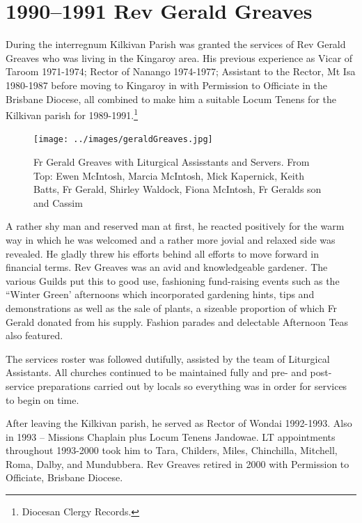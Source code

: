 \section{1990--1991 Rev Gerald Greaves}



During the interregnum Kilkivan Parish was granted the services of Rev Gerald Greaves who was living in the Kingaroy area. His previous experience as Vicar of Taroom 1971-1974; Rector of Nanango 1974-1977; Assistant to the Rector, Mt Isa 1980-1987 before moving to Kingaroy in with Permission to Officiate in the Brisbane Diocese, all combined to make him a suitable Locum Tenens for the Kilkivan parish for 1989-1991.\footnote{Diocesan Clergy Records.}








\begin{figure}
\begin{center}
\texttt{[image: ../images/geraldGreaves.jpg]}
\caption{Fr Gerald Greaves with Liturgical Assisstants and Servers. From Top: Ewen McIntosh, Marcia McIntosh, Mick Kapernick, Keith Batts, Fr Gerald, Shirley Waldock, Fiona McIntosh, Fr Geralds son and Cassim}
\end{center}
\end{figure}


A rather shy man and reserved man at first, he reacted positively for the warm way in which he was welcomed and a rather more jovial and relaxed side was revealed. He gladly threw his efforts behind all efforts to move forward in financial terms. Rev Greaves was an avid and knowledgeable gardener. The various Guilds put this to good use, fashioning fund-raising events such as the ``Winter Green' afternoons which incorporated gardening hints, tips and demonstrations as well as the sale of plants, a sizeable proportion of which Fr Gerald donated from his supply. Fashion parades and delectable Afternoon Teas also featured.



The services roster was followed dutifully, assisted by the team of Liturgical Assistants. All churches continued to be maintained fully and pre- and post-service preparations carried out by locals so everything was in order for services to begin on time.



After leaving the Kilkivan parish, he served as Rector of Wondai 1992-1993. Also in 1993 -- Missions Chaplain plus Locum Tenens Jandowae. LT appointments throughout 1993-2000 took him to Tara, Childers, Miles, Chinchilla, Mitchell, Roma, Dalby, and Mundubbera. Rev Greaves retired in 2000 with Permission to Officiate, Brisbane Diocese.




